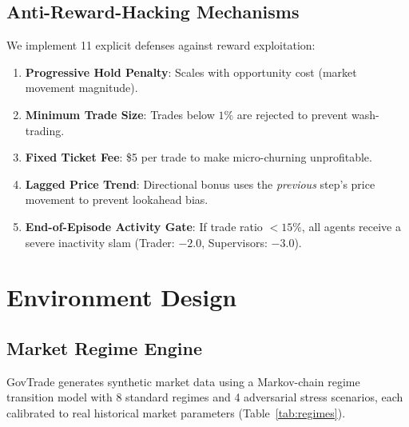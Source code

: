 \documentclass[11pt]{article}
\begin{document}
\subsection{Anti-Reward-Hacking Mechanisms}
We implement 11 explicit defenses against reward exploitation:
\begin{enumerate}[leftmargin=*]
    \item \textbf{Progressive Hold Penalty}: Scales with opportunity cost (market movement magnitude).
    \item \textbf{Minimum Trade Size}: Trades below $1\%$ are rejected to prevent wash-trading.
    \item \textbf{Fixed Ticket Fee}: \$5 per trade to make micro-churning unprofitable.
    \item \textbf{Lagged Price Trend}: Directional bonus uses the \emph{previous} step's price movement to prevent lookahead bias.
    \item \textbf{End-of-Episode Activity Gate}: If trade ratio $< 15\%$, all agents receive a severe inactivity slam (Trader: $-2.0$, Supervisors: $-3.0$).
\end{enumerate}

\section{Environment Design}
\label{sec:environment}

\subsection{Market Regime Engine}
GovTrade generates synthetic market data using a Markov-chain regime transition model with 8 standard regimes and 4 adversarial stress scenarios, each calibrated to real historical market parameters (Table~\ref{tab:regimes}).
\end{document}
